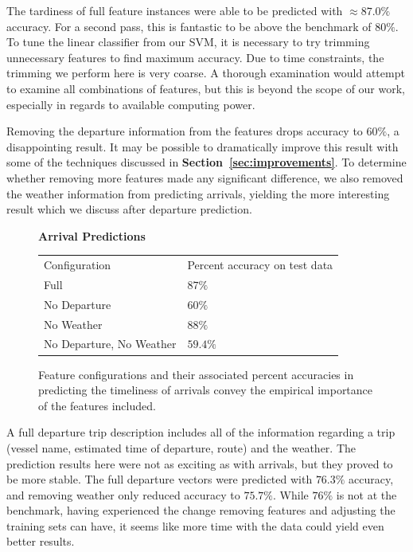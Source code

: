 \documentclass[11pt]{article} %
\begin{document}
The tardiness of full feature instances were able to be predicted with 
$\approx 87.0\%$ accuracy. For a second pass, this is fantastic to be above the
benchmark of $80\%$. To tune the linear classifier from our SVM, it is necessary
to try trimming unnecessary features to find maximum accuracy. Due to time 
constraints, the trimming we perform here is very coarse. A thorough examination
would attempt to examine all combinations of features, but this is beyond the
scope of our work, especially in regards to available computing power.

Removing the departure information from the features drops accuracy to $60\%$, 
a disappointing result. It may be possible to dramatically improve this result with
some of the techniques discussed in \textbf{Section~\ref{sec:improvements}}. 
To determine whether removing more features made any significant difference, we
also removed the weather information from predicting arrivals, yielding 
the more interesting result which we discuss after departure prediction.

\begin{figure}
    \centering
    \textbf{Arrival Predictions}

    \begin{tabular}{ll}
        Configuration & Percent accuracy on test data\\
        Full          & $87\%$\\
        No Departure  & $60\%$\\
        No Weather    & $88\%$\\
        No Departure, No Weather  & $59.4\%$\\
    \end{tabular}
    \caption{Feature configurations and their associated percent accuracies in
         predicting the timeliness of arrivals convey the empirical importance of 
         the features included.}
    \label{fig:second_run_data_arrivals}
\end{figure}

A full departure trip description includes all of the information regarding a trip
(vessel name, estimated time of departure, route) and the weather. 
The prediction results here were not
as exciting as with arrivals, but they proved to be more stable. The full 
departure vectors were predicted with $76.3\%$ accuracy, and removing weather
only reduced accuracy to $75.7\%$. While $76\%$ is not at the benchmark, having
experienced the change removing features and adjusting the training sets can have,
it seems like more time with the data could yield even better results.
\end{document}
